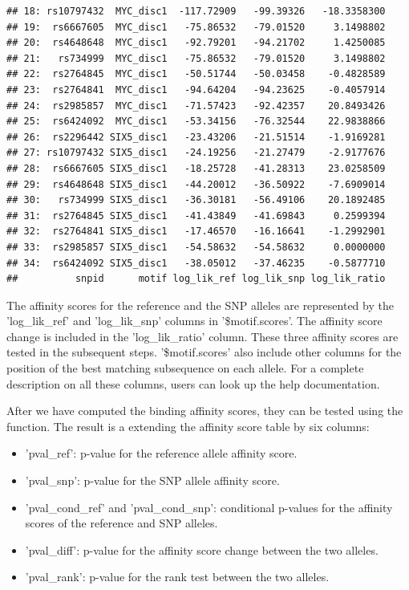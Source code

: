 \documentclass[a4paper,10pt]{article}\usepackage[]{graphicx}\usepackage[]{color}
\makeatletter
\newenvironment{kframe}{%
 \def\at@end@of@kframe{}%
 \ifinner\ifhmode%
  \def\at@end@of@kframe{\end{minipage}}%
  \begin{minipage}{\columnwidth}%
 \fi\fi%
 \def\FrameCommand##1{\hskip\@totalleftmargin \hskip-\fboxsep
 \colorbox{shadecolor}{##1}\hskip-\fboxsep
     \hskip-\linewidth \hskip-\@totalleftmargin \hskip\columnwidth}%
 \MakeFramed {\advance\hsize-\width
   \@totalleftmargin\z@ \linewidth\hsize
   \@setminipage}}%
 {\par\unskip\endMakeFramed%
 \at@end@of@kframe}
\newenvironment{knitrout}{}{} %
\makeatother
\begin{document}
\begin{knitrout}
\begin{kframe}
\begin{verbatim}
## 18: rs10797432  MYC_disc1  -117.72909   -99.39326   -18.3358300
## 19:  rs6667605  MYC_disc1   -75.86532   -79.01520     3.1498802
## 20:  rs4648648  MYC_disc1   -92.79201   -94.21702     1.4250085
## 21:   rs734999  MYC_disc1   -75.86532   -79.01520     3.1498802
## 22:  rs2764845  MYC_disc1   -50.51744   -50.03458    -0.4828589
## 23:  rs2764841  MYC_disc1   -94.64204   -94.23625    -0.4057914
## 24:  rs2985857  MYC_disc1   -71.57423   -92.42357    20.8493426
## 25:  rs6424092  MYC_disc1   -53.34156   -76.32544    22.9838866
## 26:  rs2296442 SIX5_disc1   -23.43206   -21.51514    -1.9169281
## 27: rs10797432 SIX5_disc1   -24.19256   -21.27479    -2.9177676
## 28:  rs6667605 SIX5_disc1   -18.25728   -41.28313    23.0258509
## 29:  rs4648648 SIX5_disc1   -44.20012   -36.50922    -7.6909014
## 30:   rs734999 SIX5_disc1   -36.30181   -56.49106    20.1892485
## 31:  rs2764845 SIX5_disc1   -41.43849   -41.69843     0.2599394
## 32:  rs2764841 SIX5_disc1   -17.46570   -16.16641    -1.2992901
## 33:  rs2985857 SIX5_disc1   -54.58632   -54.58632     0.0000000
## 34:  rs6424092 SIX5_disc1   -38.05012   -37.46235    -0.5877710
##          snpid      motif log_lik_ref log_lik_snp log_lik_ratio
\end{verbatim}
\end{kframe}
\end{knitrout}


The affinity scores for the reference and the SNP alleles are represented by the 'log\_lik\_ref' and 'log\_lik\_snp' columns in '\$motif.scores'. The affinity score change is included in the 'log\_lik\_ratio' column. These three affinity scores are tested in the subsequent steps. '\$motif.scores' also include other columns for the position of the best matching subsequence on each allele. For a complete description on all these columns, users can look up the help documentation.

After we have computed the binding affinity scores, they can be tested using the  function. The result is a  extending the affinity score table by six columns: 

\begin{itemize}
  \item 'pval\_ref': p-value for the reference allele affinity score.
  \item 'pval\_snp': p-value for the SNP allele affinity score.
  \item 'pval\_cond\_ref' and 'pval\_cond\_snp': conditional p-values
    for the affinity scores of the reference and SNP alleles.
  \item 'pval\_diff': p-value for the affinity score change between the two alleles.
  \item 'pval\_rank': p-value for the rank test between the two alleles.
  \end{itemize}
\end{document}
